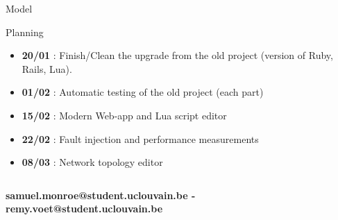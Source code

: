 \documentclass[final,hyperref={pdfpagelabels=false}]{beamer}
\begin{document}
\begin{frame}[t]
\begin{columns}[t]
\begin{column}{.465\textwidth}
\begin{block}{Model}
\end{block}


\begin{block}{Planning}

\begin{itemize}
    \item \textbf{20/01} : Finish/Clean the upgrade from the old project (version of Ruby, Rails, Lua).
    \item \textbf{01/02} : Automatic testing of the old project (each part)
    \item \textbf{15/02} : Modern Web-app and Lua script editor
    \item \textbf{22/02} : Fault injection and performance measurements
    \item \textbf{08/03} : Network topology editor
\end{itemize}

\end{block}

\end{column} %

\begin{column}{.015\textwidth}\end{column} %

\end{columns} %


\begin{center}
\color {white}
\textbf{samuel.monroe@student.uclouvain.be - remy.voet@student.uclouvain.be}
\bigskip
\end{center}
\end{frame} %
\end{document}
